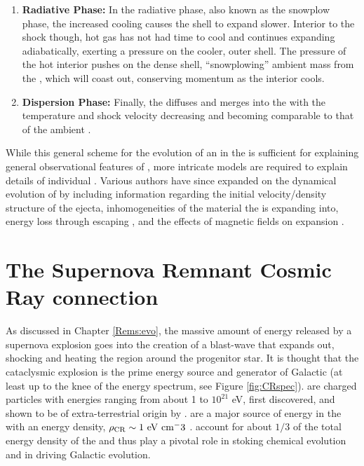 \begin{enumerate}
	\item \textbf{Radiative Phase:} In the radiative phase, also known as the snowplow phase, the increased cooling causes the \snr{} shell to expand slower. Interior to the shock though, hot gas has not had time to cool and continues expanding adiabatically, exerting a pressure on the cooler, outer shell. The pressure of the hot interior pushes on the dense shell,  ``snowplowing'' ambient mass from the \ism{}, which will coast out, conserving momentum as the interior cools. 
	\item \textbf{Dispersion Phase:} Finally, the \snr{} diffuses and merges into the \ism{} with the temperature and shock velocity decreasing and becoming comparable to that of the ambient \ism{}.
\end{enumerate}

While this general scheme for the evolution of an \snr{} in the \ism{} is sufficient for explaining general observational features of \snrs{}, more intricate models are required to explain details of individual \snrs{}. Various authors have since expanded on the dynamical evolution of \snrs{} by including information regarding the initial velocity/density structure of the ejecta, inhomogeneities of the material the \snr{} is expanding into, energy loss through escaping \crs{}, and the effects of magnetic fields on expansion \citep[and references in \cite{Vink12} which reviews various analytic ]{Chevalier74,Chevalier82,Truelove99}.
  
\section{\label{Rems:CR}The Supernova Remnant Cosmic Ray connection}

As discussed in Chapter \ref{Rems:evo}, the massive amount of energy released by a supernova explosion goes into the creation of a blast-wave that expands out, shocking and heating the region around the progenitor star. It is thought that the cataclysmic explosion is the prime energy source and generator of Galactic \crs{} (at least up to the knee of the \cray{} energy spectrum, see Figure \ref{fig:CRspec}).  \crs{} are charged particles with energies ranging from about 1\mev{} to $10^{21}$ eV, first discovered, and shown to be of extra-terrestrial origin by \cite{Hess12}. \crs{} are a major source of energy in the \ism{} with an energy density,  ${\rm \rho_{CR} \sim 1~eV~cm^-3}$ \citep{Blasi13,Horandel08}. \crs{} account for about $1/3$ of the total energy density of the \ism{} and thus play a pivotal role in stoking chemical evolution and in  driving Galactic evolution. 

